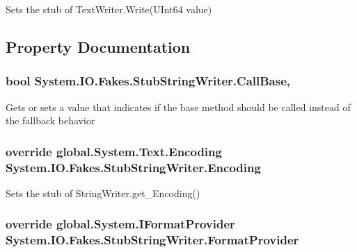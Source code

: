 Sets the stub of Text\-Writer.\-Write(\-U\-Int64 value)



\subsection{Property Documentation}
\hypertarget{class_system_1_1_i_o_1_1_fakes_1_1_stub_string_writer_a1358a2012cdbf029346bd3818e264942}{
\subsubsection[{Call\-Base}]{\setlength{\rightskip}{0pt plus 5cm}bool System.\-I\-O.\-Fakes.\-Stub\-String\-Writer.\-Call\-Base\hspace{0.3cm}{\ttfamily [get]}, {\ttfamily [set]}}}\label{class_system_1_1_i_o_1_1_fakes_1_1_stub_string_writer_a1358a2012cdbf029346bd3818e264942}


Gets or sets a value that indicates if the base method should be called instead of the fallback behavior

\hypertarget{class_system_1_1_i_o_1_1_fakes_1_1_stub_string_writer_acad4d2552ad82f0c3214c631bd733233}{
\subsubsection[{Encoding}]{\setlength{\rightskip}{0pt plus 5cm}override global.\-System.\-Text.\-Encoding System.\-I\-O.\-Fakes.\-Stub\-String\-Writer.\-Encoding\hspace{0.3cm}{\ttfamily [get]}}}\label{class_system_1_1_i_o_1_1_fakes_1_1_stub_string_writer_acad4d2552ad82f0c3214c631bd733233}


Sets the stub of String\-Writer.\-get\-\_\-\-Encoding()

\hypertarget{class_system_1_1_i_o_1_1_fakes_1_1_stub_string_writer_ab1e6624f6e683df43626579b426a6696}{
\subsubsection[{Format\-Provider}]{\setlength{\rightskip}{0pt plus 5cm}override global.\-System.\-I\-Format\-Provider System.\-I\-O.\-Fakes.\-Stub\-String\-Writer.\-Format\-Provider\hspace{0.3cm}{\ttfamily [get]}}}\label{class_system_1_1_i_o_1_1_fakes_1_1_stub_string_writer_ab1e6624f6e683df43626579b426a6696}


